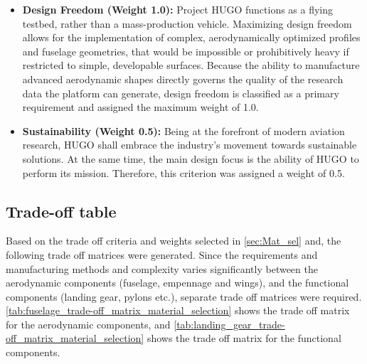 \begin{itemize}
    \item \textbf{Design Freedom (Weight 1.0):} Project HUGO functions as a flying testbed, rather than a mass-production vehicle. Maximizing design freedom allows for the implementation of complex, aerodynamically optimized profiles and fuselage geometries, that would be impossible or prohibitively heavy if restricted to simple, developable surfaces. Because the ability to manufacture advanced aerodynamic shapes directly governs the quality of the research data the platform can generate, design freedom is classified as a primary requirement and assigned the maximum weight of 1.0.

    \item \textbf{Sustainability (Weight 0.5):} Being at the forefront of modern aviation research, HUGO shall embrace the industry's movement towards sustainable solutions. At the same time, the main design focus is the ability of HUGO to perform its mission. Therefore, this criterion was assigned a weight of 0.5.
    \end{itemize}

\subsection{Trade-off table}

Based on the trade off criteria and weights selected in \autoref{sec:Mat_sel} and, the following trade off matrices were generated. Since the requirements and manufacturing methods and complexity varies significantly between the aerodynamic components (fuselage, empennage and wings), and the functional components (landing gear, pylons etc.), separate trade off matrices were required. \autoref{tab:fuselage_trade-off_matrix_material_selection} shows the trade off matrix for the aerodynamic components, and \autoref{tab:landing_gear_trade-off_matrix_material_selection} shows the trade off matrix for the functional components. 

